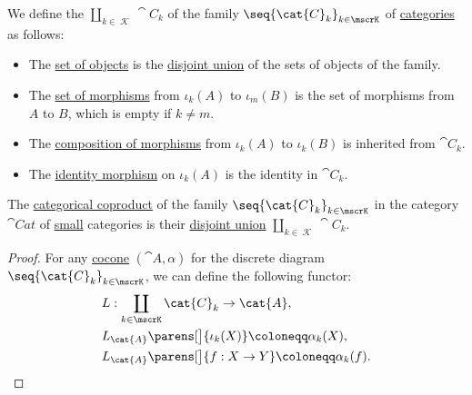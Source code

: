 \begin{definition}\label{def:category_disjoint_union}\mimprovised
  We define the  \( \coprod_{k \in \mscrK} \cat{C}_k \) of the family \( \seq{ \cat{C}_k }_{k \in \mscrK} \) of \hyperref[def:category]{categories} as follows:

  \begin{itemize}
    \item The \hyperref[def:category/objects]{set of objects} is the \hyperref[def:disjoint_union]{disjoint union} of the sets of objects of the family.

    \item The \hyperref[def:category/morphisms]{set of morphisms} from \( \iota_k(A) \) to \( \iota_m(B) \) is the set of morphisms from \( A \) to \( B \), which is empty if \( k \neq m \).

    \item The \hyperref[def:category/composition]{composition of morphisms} from \( \iota_k(A) \) to \( \iota_k(B) \) is inherited from \( \cat{C}_k \).

    \item The \hyperref[def:category/identity]{identity morphism} on \( \iota_k(A) \) is the identity in \( \cat{C}_k \).
  \end{itemize}
\end{definition}

\begin{proposition}\label{thm:category_coproduct}
  The \hyperref[def:discrete_category_limits]{categorical coproduct} of the family \( \seq{ \cat{C}_k }_{k \in \mscrK} \) in the category \hyperref[def:category_of_small_categories]{\( \cat{Cat} \)} of \hyperref[def:small_set]{small} categories is their \hyperref[def:category_disjoint_union]{disjoint union} \( \coprod_{k \in \mscrK} \cat{C}_k \).
\end{proposition}
\begin{proof}
  For any \hyperref[def:category_of_cones/cocone]{cocone} \( (\cat{A}, \alpha) \) for the discrete diagram \( \seq{ \cat{C}_k }_{k \in \mscrK} \), we can define the following functor:
  \begin{equation*}
    \begin{aligned}
      &L: \coprod_{k \in \mscrK} \cat{C}_k \to \cat{A}, \\
      &L_{\cat{A}}\parens[\big]{ \iota_k(X) } \coloneqq \alpha_k(X), \\
      &L_{\cat{A}}\parens[\big]{ f: X \to Y } \coloneqq \alpha_k(f).
    \end{aligned}
  \end{equation*}
\end{proof}

